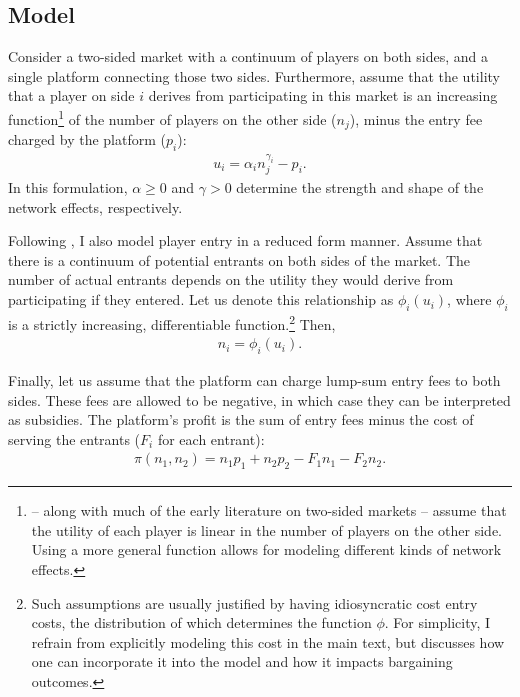\subsection{Model}

Consider a two-sided market with a continuum of players on both sides, and a single platform connecting those two sides.
Furthermore, assume that the utility that a player on side $i$ derives from participating in this market is an increasing function\footnote{
    \textcite{armstrong2006competition} -- along with much of the early literature on two-sided markets \parencite[e.g.][]{rochet2003platform,hagiu2006pricing} -- assume that the utility of each player is linear in the number of players on the other side.
    Using a more general function allows for modeling different kinds of network effects.
} of the number of players on the other side ($n_j$), minus the entry fee charged by the platform ($p_i$):
\begin{align*}
    u_i = \alpha_i n_j ^ {\gamma_i} - p_i.
\end{align*}
In this formulation, $\alpha \geq 0$ and $\gamma > 0$ determine the strength and shape of the network effects, respectively.

Following \textcite{armstrong2006competition}, I also model player entry in a reduced form manner.
Assume that there is a continuum of potential entrants on both sides of the market.
The number of actual entrants depends on the utility they would derive from participating if they entered.
Let us denote this relationship as $\phi_i(u_i)$, where $\phi_i$ is a strictly increasing, differentiable function.\footnote{
    Such assumptions are usually justified by having idiosyncratic cost entry costs, the distribution of which determines the function $\phi$.
    For simplicity, I refrain from explicitly modeling this cost in the main text, but  discusses how one can incorporate it into the model and how it impacts bargaining outcomes.
}
Then,
\begin{align*}
    n_i = \phi_i(u_i).
\end{align*}

Finally, let us assume that the platform can charge lump-sum entry fees to both sides.
These fees are allowed to be negative, in which case they can be interpreted as subsidies.
The platform's profit is the sum of entry fees minus the cost of serving the entrants ($F_i$ for each entrant):
\begin{align*}
    \pi(n_1, n_2) = n_1 p_1 + n_2 p_2 - F_1 n_1 - F_2 n_2.
\end{align*}

